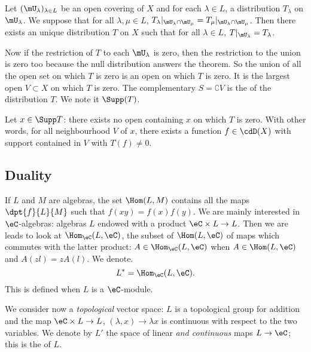 \begin{theorem}
	Let $(\mU_{\lambda})_{\lambda\in L}$ be an open covering of $X$ and for each $\lambda\in L$, a distribution $T_{\lambda}$ on $\mU_{\lambda}$. We suppose that for all $\lambda,\mu\in L$, $T_{\lambda}|_{\mU_{\lambda}\cap\mU_{\mu}}=T_{\mu}|_{\mU_{\lambda}\cap\mU_{\mu}}$. Then there exists an unique distribution $T$ on $X$ such that for all $\lambda\in L$, $T|_{\mU_{\lambda}}=T_{\lambda}$.
\end{theorem}

Now if the restriction  of $T$ to each $\mU_{\lambda}$ is zero, then the restriction to the union is zero too because the null distribution answers the theorem. So the union of all the open set on which $T$ is zero is an open on which $T$ is zero. It is the largest open $V\subset X$ on which $T$ is zero. The complementary $S=\complement V$ is the  of the distribution $T$. We note it $\Supp(T)$.

Let $x\in\Supp T$: there exists no open containing $x$ on which $T$ is zero. With other words, for all  neighbourhood $V$ of $x$, there exists a function $f\in\cdD(X)$ with support contained in $V$ with $T(f)\neq 0$.

\subsection{Duality}

If $L$ and $M$ are algebras, the set $\Hom(L,M)$ contains all the maps $\dpt{f}{L}{M}$ such that $f(xy)=f(x)f(y)$. We are mainly interested in $\eC$-algebras: algebras $L$ endowed with a product $\eC\times L\to L$. Then we are leads to look at $\Hom_{\eC}(L,\eC)$, the subset of $\Hom(L,\eC)$ of maps which commutes with the latter product: $A\in\Hom_{\eC}(L,\eC)$ when $A\in\Hom(L,\eC)$ and $A(zl)=zA(l)$. We denote.
\begin{equation}
	L^*=\Hom_{\eC}(L,\eC).
\end{equation}
This is defined when $L$ is a $\eC$-module.

We consider now a \emph{topological} vector space: $L$ is a topological group for addition and the map $\eC\times L\to L$, $(\lambda,x)\to \lambda x$ is continuous with respect to the two variables. We denote by $L'$ the space of linear \emph{and continuous} maps $L\to \eC$; this is the  of $L$.

